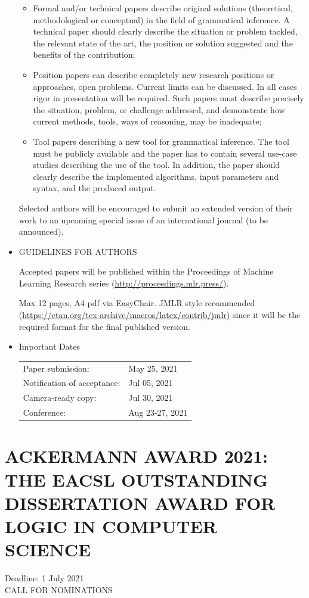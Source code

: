 \documentclass[prodmode,acmtecs]{acmsmall} %
\begin{document}
\begin{itemize}
\begin{itemize}\item  Formal and/or technical papers describe original solutions (theoretical, methodological or conceptual) in the field of grammatical inference. A technical paper should clearly describe the situation or problem tackled, the relevant state of the art, the position or solution suggested and the benefits of the contribution;
\item  Position papers can describe completely new research positions or approaches, open problems. Current limits can be discussed. In all cases rigor in presentation will be required. Such papers must describe precisely the situation, problem, or challenge addressed, and demonstrate how current methods, tools, ways of reasoning, may be inadequate;
\item  Tool papers describing a new tool for grammatical inference. The tool must be publicly available and the paper has to contain several use-case studies describing the use of the tool. In addition, the paper should clearly describe the implemented algorithms, input parameters and syntax, and the produced output.
\end{itemize} 
   Selected authors will be encouraged to submit an extended version of their work to an upcoming  special issue of an international journal (to be announced). 
 
\item  GUIDELINES FOR AUTHORS 
 
  Accepted papers will be published within the Proceedings of Machine Learning Research series (\href{http://proceedings.mlr.press/}{http://proceedings.mlr.press/}).  
 
  Max 12 pages, A4 pdf via EasyChair. JMLR style recommended (\href{https://ctan.org/tex-archive/macros/latex/contrib/jmlr}{https://ctan.org/tex-archive/macros/latex/contrib/jmlr}) since it will be the required format for the final published version. 
 
\item  Important Dates 
 
\begin{tabulary}{\linewidth}{LL}Paper submission:  & May 25, 2021 \\
Notification of acceptance:  & Jul 05, 2021 \\
Camera-ready copy:  & Jul 30, 2021 \\
Conference:  & Aug 23-27, 2021 \\
\end{tabulary}
 
\end{itemize}\section{ACKERMANN AWARD 2021: THE EACSL OUTSTANDING DISSERTATION AWARD FOR LOGIC IN COMPUTER SCIENCE}\label{ACKERMANNAWARD2021}  Deadline: 1 July 2021\\ 
CALL FOR NOMINATIONS 
\end{document}
